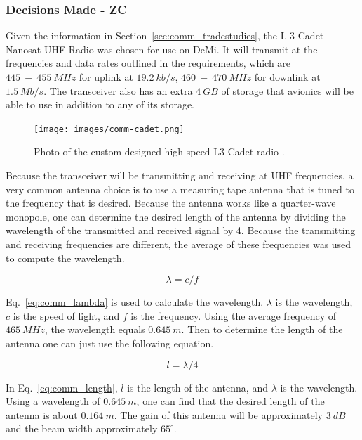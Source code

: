 \documentclass[12pt]{article}
\begin{document}
			\subsubsection{Decisions Made - ZC}

Given the information in Section~\ref{sec:comm_tradestudies}, the L-3 Cadet Nanosat UHF Radio was chosen for use on DeMi. It will transmit at the frequencies and data rates outlined in the requirements, which are $445\ -\ 455\ MHz$ for uplink at $19.2\ kb/s$, $460\ -\ 470\ MHz$ for downlink at $1.5\ Mb/s$. The transceiver also has an extra $4\ GB$ of storage that avionics will be able to use in addition to any of its storage. 

\begin{figure}[ht]
\centering
  \texttt{[image: images/comm-cadet.png]}
\caption{Photo of the custom-designed high-speed L3 Cadet radio \cite{DICE}.}
\label{fig:comm_Cadet}
\end{figure}

Because the transceiver will be transmitting and receiving at UHF frequencies, a very common antenna choice is to use a measuring tape antenna that is tuned to the frequency that is desired. Because the antenna works like a quarter-wave monopole, one can determine the desired length of the antenna by dividing the wavelength of the transmitted and received signal by 4. Because the transmitting and receiving frequencies are different, the average of these frequencies was used to compute the wavelength. 

\begin{equation}\label{eq:comm_lambda}
\lambda = c/f
\end{equation}

Eq.~\ref{eq:comm_lambda} is used to calculate the wavelength. $\lambda$ is the wavelength, $c$ is the speed of light, and $f$ is the frequency. Using the average frequency of $465\ MHz$, the wavelength equals $0.645\ m$. Then to determine the length of the antenna one can just use the following equation.

\begin{equation}\label{eq:comm_length}
l = \lambda/4
\end{equation}

In Eq.~\ref{eq:comm_length}, $l$ is the length of the antenna, and $\lambda$ is the wavelength. Using a wavelength of $0.645\ m$, one can find that the desired length of the antenna is about $0.164\ m$. The gain of this antenna will be approximately $3\ dB$ and the beam width approximately $65^\circ$.
\end{document}
